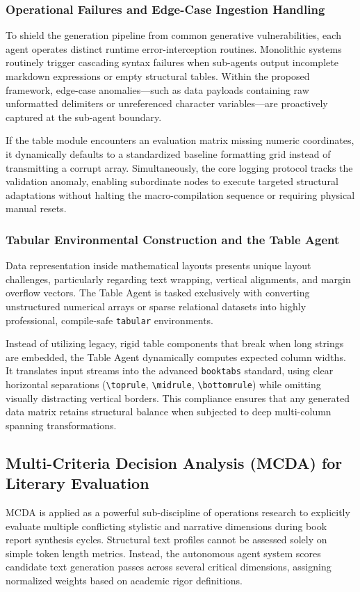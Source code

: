 \subsubsection{Operational Failures and Edge-Case Ingestion Handling}
To shield the generation pipeline from common generative vulnerabilities, each agent operates distinct runtime error-interception routines. Monolithic systems routinely trigger cascading syntax failures when sub-agents output incomplete markdown expressions or empty structural tables. Within the proposed framework, edge-case anomalies—such as data payloads containing raw unformatted delimiters or unreferenced character variables—are proactively captured at the sub-agent boundary. 

If the table module encounters an evaluation matrix missing numeric coordinates, it dynamically defaults to a standardized baseline formatting grid instead of transmitting a corrupt array. Simultaneously, the core logging protocol tracks the validation anomaly, enabling subordinate nodes to execute targeted structural adaptations without halting the macro-compilation sequence or requiring physical manual resets.

\subsubsection{Tabular Environmental Construction and the Table Agent}
Data representation inside mathematical layouts presents unique layout challenges, particularly regarding text wrapping, vertical alignments, and margin overflow vectors. The Table Agent is tasked exclusively with converting unstructured numerical arrays or sparse relational datasets into highly professional, compile-safe \texttt{tabular} environments.

Instead of utilizing legacy, rigid table components that break when long strings are embedded, the Table Agent dynamically computes expected column widths. It translates input streams into the advanced \texttt{booktabs} standard, using clear horizontal separations (\texttt{\textbackslash toprule}, \texttt{\textbackslash midrule}, \texttt{\textbackslash bottomrule}) while omitting visually distracting vertical borders. This compliance ensures that any generated data matrix retains structural balance when subjected to deep multi-column spanning transformations.

\subsection{Multi-Criteria Decision Analysis (MCDA) for Literary Evaluation}
MCDA is applied as a powerful sub-discipline of operations research to explicitly evaluate multiple conflicting stylistic and narrative dimensions during book report synthesis cycles. Structural text profiles cannot be assessed solely on simple token length metrics. Instead, the autonomous agent system scores candidate text generation passes across several critical dimensions, assigning normalized weights based on academic rigor definitions. 

